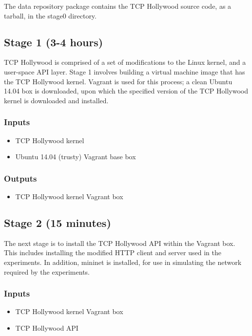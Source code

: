 \documentclass[sigconf]{acmart}
\begin{document}
The data repository package contains the TCP Hollywood source code, as a tarball, in the
stage0 directory.

\subsection*{Stage 1 (3-4 hours)}

TCP Hollywood is comprised of a set of modifications to the Linux kernel, and a user-space
API layer. Stage 1 involves building a virtual machine image that has the TCP
Hollywood kernel. Vagrant is used for this process; a clean Ubuntu 14.04 box is downloaded,
upon which the specified version of the TCP Hollywood kernel is downloaded and installed.

\subsubsection*{Inputs}
\begin{itemize}
\item TCP Hollywood kernel
\item Ubuntu 14.04 (trusty) Vagrant base box
\end{itemize}
\subsubsection*{Outputs}
\begin{itemize}
\item TCP Hollywood kernel Vagrant box
\end{itemize}

\subsection*{Stage 2 (15 minutes)}

The next stage is to install the TCP Hollywood API within the Vagrant box. This includes
installing the modified HTTP client and server used in the experiments. In addition,
mininet is installed, for use in simulating the network required by the experiments.

\subsubsection*{Inputs}
\begin{itemize}
\item TCP Hollywood kernel Vagrant box
\item TCP Hollywood API
\end{itemize}
\end{document}
